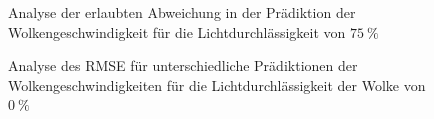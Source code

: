 \begin{figure}[h!]
    \centering
    \setlength{\fboxsep}{1pt}
    \setlength{\fboxrule}{1pt}
    \caption[Analyse der erlaubten Abweichung in der Prädiktion der Wolkengeschwindigkeit für die Lichtdurchlässigkeit von $\SI{75}{\percent}$]{Analyse der erlaubten Abweichung in der Prädiktion der Wolkengeschwindigkeit für die Lichtdurchlässigkeit von $\SI{75}{\percent}$}
    \label{fig_speed75}
\end{figure}

\begin{figure}[h!]
    \centering
\setlength{\fboxsep}{1pt}
\setlength{\fboxrule}{1pt}
\caption[Analyse des RMSE für unterschiedliche Prädiktionen der Wolkengeschwindigkeiten für die Lichtdurchlässigkeit der Wolke von $\SI{0}{\percent}$]{Analyse des RMSE für unterschiedliche Prädiktionen der Wolkengeschwindigkeiten für die Lichtdurchlässigkeit der Wolke von $\SI{0}{\percent}$}
\label{fig_speed00RMSE}
\end{figure}


